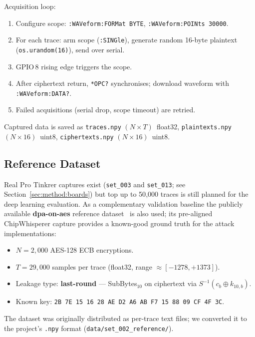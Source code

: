 Acquisition loop:
\begin{enumerate}
  \item Configure scope: \texttt{:WAVeform:FORMat BYTE},
        \texttt{:WAVeform:POINts 30000}.
  \item For each trace: arm scope (\texttt{:SINGle}), generate random
        16-byte plaintext (\texttt{os.urandom(16)}), send over serial.
  \item GPIO\,8 rising edge triggers the scope.
  \item After ciphertext return, \texttt{*OPC?} synchronises; download
        waveform with \texttt{:WAVeform:DATA?}.
  \item Failed acquisitions (serial drop, scope timeout) are retried.
\end{enumerate}

Captured data is saved as \texttt{traces.npy} $(N \times T)$~float32,
\texttt{plaintexts.npy} $(N \times 16)$~uint8,
\texttt{ciphertexts.npy} $(N \times 16)$~uint8.

\subsection{Reference Dataset}
\label{sec:method:ref}

Real Pro Tinkrer captures exist (\texttt{set\_003} and \texttt{set\_013};
see Section~\ref{sec:method:boards}) but top up to 50{,}000 traces is still
planned for the deep learning evaluation.
As a complementary validation baseline the publicly available
\textbf{dpa-on-aes} reference dataset~\cite{oflynn2015chipwhisperer} is
also used; its pre-aligned ChipWhisperer capture provides a known-good
ground truth for the attack implementations:

\begin{itemize}
  \item $N = 2{,}000$ AES-128 ECB encryptions.
  \item $T = 29{,}000$ samples per trace (float32, range $\approx[-1278, +1373]$).
  \item Leakage type: \textbf{last-round} --- SubBytes$_{10}$ on ciphertext
        via $S^{-1}(c_b \oplus k_{10,b})$.
  \item Known key: \texttt{2B 7E 15 16 28 AE D2 A6 AB F7 15 88 09 CF 4F 3C}.
\end{itemize}

The dataset was originally distributed as per-trace text files;
we converted it to the project's \texttt{.npy} format
(\texttt{data/set\_002\_reference/}).


